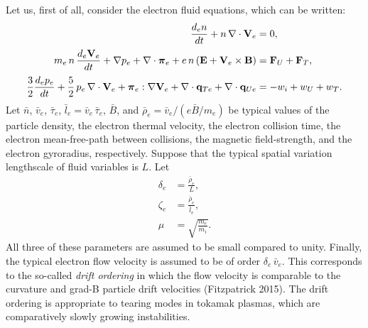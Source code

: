 \documentclass[notitlepage,12pt]{article}
\newcommand{\bpi}{\mbox{\boldmath$\pi$}}
\begin{document}
Let us, first of all, consider the electron fluid equations, which can
be written:
\begin{align}
\frac{d_e n}{dt} + n\,\nabla\cdot{\bf V}_e &= 0,\\[0.5ex]
m_e\, n\,\frac{d_e {\bf V}_e}{dt} + \nabla p_e+ \nabla\cdot \bpi_e + e\, n\,
({\bf E} + {\bf V}_e\times {\bf B})& = {\bf F}_U +{\bf F}_T,\\[0.5ex]
\frac{3}{2}\frac{d_e p_e}{dt} + \frac{5}{2}\,p_e\,\nabla\cdot{\bf V}_e
+ \bpi_e:\nabla{\bf V}_e+ \nabla\cdot{\bf q}_{Te} 
+ \nabla\cdot{\bf q}_{Ue} &= -w_i+w_U + w_T.
\end{align}
Let $\bar{n}$, $\bar{v}_e$, $\bar{\tau}_e$, $\bar{l}_e=\bar{v}_e\,\bar{\tau}_e$, $\bar{B}$,
and $\bar{\rho}_e =\bar{ v}_e/(e\bar{B}/m_e)$  be typical values
of the particle density, the electron thermal velocity, the electron collision time, the electron
mean-free-path between collisions,  the magnetic field-strength, and the
electron gyroradius,  respectively. 
Suppose that the typical spatial variation lengthscale of fluid variables is $L$. Let
 \begin{align}
\delta_e &=\frac{\bar{\rho}_e}{L},\\[0.5ex]
\zeta_e &= \frac{\bar{\rho}_e}{\bar{l}_e},\\[0.5ex]
\mu &= \sqrt{\frac{m_e}{m_i}}.
\end{align}
All three of these parameters are assumed to be  small
compared to unity. Finally, the typical electron flow velocity is assumed to be of order $\delta_e\,\bar{v}_e$. This corresponds
to the so-called {\em drift ordering}\/ in which the flow velocity is comparable to the curvature and grad-B particle
drift velocities (Fitzpatrick 2015). The drift ordering is appropriate to tearing modes in tokamak plasmas, which are comparatively
slowly growing instabilities. 
\end{document}
